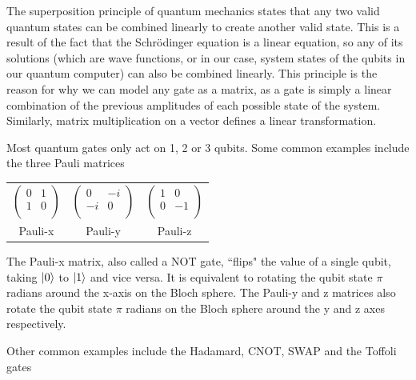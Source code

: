 \documentclass[11pt]{report}
\newcommand{\?}{\stackrel{?}{=}}
\begin{document}
The superposition principle of quantum mechanics states that any two valid quantum states can be combined linearly to create another valid state. This is a result of the fact that the Schrödinger equation is a linear equation, so any of its solutions (which are wave functions, or in our case, system states of the qubits in our quantum computer) can also be combined linearly. This principle is the reason for why we can model any gate as a matrix, as a gate is simply a linear combination of the previous amplitudes of each possible state of the system. Similarly, matrix multiplication on a vector defines a linear transformation.

Most quantum gates only act on 1, 2 or 3 qubits. Some common examples include the three Pauli matrices

\begin{table}[h!]
\centering
\begin{tabular}{ c c c }
  $\begin{pmatrix}
0 & 1 \\
1 & 0 \\
\end{pmatrix}$ & $\begin{pmatrix}
0 & -i \\
-i & 0 \\
\end{pmatrix}$ & $\begin{pmatrix}
1 & 0 \\
0 & -1 \\
\end{pmatrix}$ \\
  Pauli-x & Pauli-y & Pauli-z \\
\end{tabular}
\end{table}

The Pauli-x matrix, also called a NOT gate, ``flips" the value of a single qubit, taking $\ket{0}$ to $\ket{1}$ and vice versa. It is equivalent to rotating the qubit state $\pi$ radians around the x-axis on the Bloch sphere. The Pauli-y and z matrices also rotate the qubit state $\pi$ radians on the Bloch sphere around the y and z axes respectively.

Other common examples include the Hadamard, CNOT, SWAP and the Toffoli gates
\end{document}
